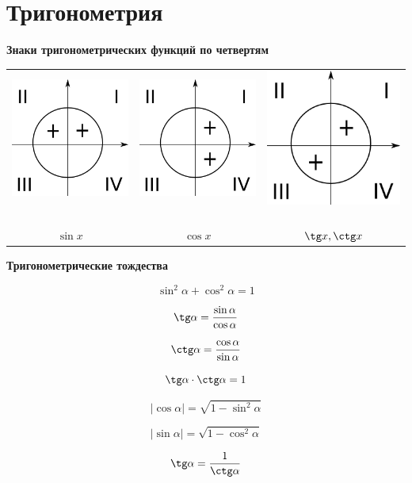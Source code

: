 \documentclass[a5paper, 8pt]{extarticle}
\begin{document}
\section{Тригонометрия}

\textbf{Знаки тригонометрических функций по четвертям}

\begin{center}
\begin{tabular}{ccc}
\includegraphics[width=0.25\linewidth]{img01.png} \ & \includegraphics[width=0.25\linewidth]{img02.png} \ & \includegraphics[width=0.25\linewidth]{img03.png} \ \\ 
$\sin x$ & $\cos x$ & $\tg x, \ctg x$ \\ 
\end{tabular} 
\end{center}

\textbf{Тригонометрические тождества}

$$\sin^2\alpha+\cos^2\alpha=1$$

$$\tg\alpha =\frac{\sin\alpha}{\cos\alpha}$$

$$\ctg\alpha =\frac{\cos\alpha}{\sin\alpha}$$

$$\tg\alpha \cdot \ctg\alpha = 1$$

$$|\cos \alpha |=\sqrt{1-\sin^2\alpha}$$

$$|\sin \alpha |=\sqrt{1-\cos^2\alpha}$$

$$\tg\alpha = \frac{1}{\ctg\alpha}$$
\end{document}
